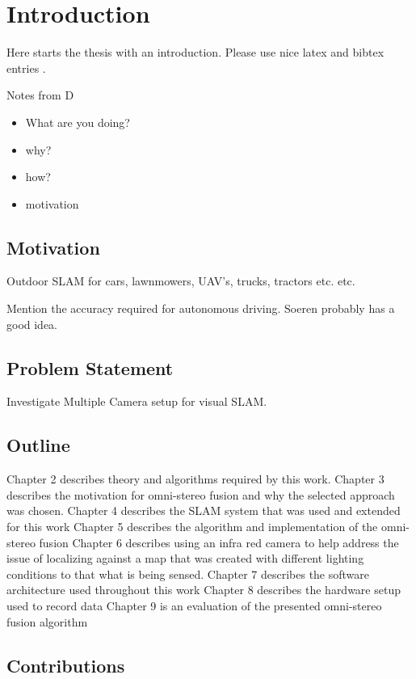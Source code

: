 \chapter{Introduction}
\label{chapter:Introduction}

Here starts the thesis with an introduction. Please use nice latex and bibtex entries \cite{latex}. 

Notes from D
\begin{itemize}
\itemsep0em
 \item What are you doing?
 \item why?
 \item how?
 \item motivation
\end{itemize}

\section{Motivation}

Outdoor SLAM for cars, lawnmowers, UAV's, trucks, tractors etc. etc.

Mention the accuracy required for autonomous driving.  Soeren probably has a good idea.

\section{Problem Statement}

Investigate Multiple Camera setup for visual SLAM.

\section{Outline}
 
Chapter 2 describes theory and algorithms required by this work.  \newline
Chapter 3 describes the motivation for omni-stereo fusion and why the selected approach was chosen.
\newline
Chapter 4 describes the SLAM system that was used and extended for this work \newline
Chapter 5 describes the algorithm and implementation of the omni-stereo fusion \newline
Chapter 6 describes using an infra red camera to help address the issue of localizing against a map
that was created with different lighting conditions to that what is being sensed.\newline
Chapter 7 describes the software architecture used throughout this work \newline
Chapter 8 describes the hardware setup used to record data \newline
Chapter 9 is an evaluation of the presented omni-stereo fusion algorithm \newline

\section{Contributions}